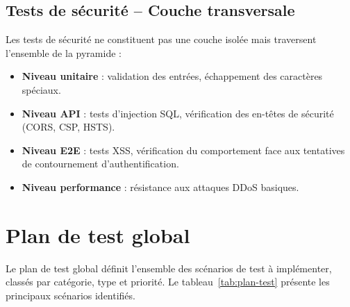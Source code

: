 \subsection{Tests de sécurité -- Couche transversale}
\label{subsec:tests-securite}

Les tests de sécurité ne constituent pas une couche isolée mais traversent l'ensemble de la pyramide :
\begin{itemize}[nosep]
    \item \textbf{Niveau unitaire} : validation des entrées, échappement des caractères spéciaux.
    \item \textbf{Niveau API} : tests d'injection SQL, vérification des en-têtes de sécurité (CORS, CSP, HSTS).
    \item \textbf{Niveau E2E} : tests XSS, vérification du comportement face aux tentatives de contournement d'authentification.
    \item \textbf{Niveau performance} : résistance aux attaques DDoS basiques.
\end{itemize}

\section{Plan de test global}
\label{sec:plan-test-global}

Le plan de test global définit l'ensemble des scénarios de test à implémenter, classés par catégorie, type et priorité. Le tableau~\ref{tab:plan-test} présente les principaux scénarios identifiés.

